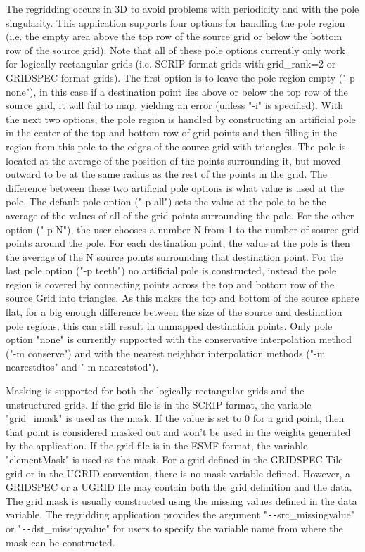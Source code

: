 The regridding occurs in 3D to avoid
problems with periodicity and with the pole singularity. This application
supports four options for handling the pole region (i.e. the empty area above the top row of the source grid or below
the bottom row of the source grid).  Note that all of these pole options currently only work for logically rectangular grids (i.e. SCRIP format grids with grid\_rank=2 or GRIDSPEC format grids). The first option is to leave the pole region empty ("-p none"), in this
case if a destination point lies above or below the
top row of the source grid, it will fail to map, yielding an error (unless "-i" is specified).
With the next two options, the pole region is handled by constructing
an artificial pole in the center of the top and bottom row of grid points and then filling
in the region from this pole to the edges of the source grid with triangles.
The pole is located at the average of the position of the points surrounding
it, but moved outward to be at the same radius as the rest of the points
in the grid. The difference between these two artificial pole options is what value is used at the pole.
The default pole option ("-p all") sets the value at the pole to be the average of the values
of all of the grid points surrounding the pole. For the other option ("-p N"), the user chooses
a number N from 1 to the number of source grid points around the pole. For
each destination point, the value at the pole is then the average of the N source points
surrounding that destination point. For the last pole option ("-p teeth") no artificial pole is constructed, instead the
pole region is covered by connecting points across the top and bottom row of the source Grid into triangles. As
this makes the top and bottom of the source sphere flat, for a big enough difference between the size of
the source and destination pole regions, this can still result in unmapped destination points.
Only pole option "none" is currently supported with the conservative interpolation method ("-m conserve") and with the
nearest neighbor interpolation methods ("-m nearestdtos" and "-m neareststod").

Masking is supported for both the logically rectangular grids and the unstructured grids.
If the grid file is in the SCRIP format, the variable "grid\_imask" is used as the mask.
If the value is set to 0 for a grid point, then that point is considered masked out and
won't be used in the weights generated by the application. If the grid file is in the ESMF format, the variable "elementMask" is used as the mask.  For a grid defined in the GRIDSPEC
Tile grid or in the UGRID convention, there is no mask variable defined.
However, a GRIDSPEC or a UGRID file may contain both the grid definition and the data.
The grid mask is usually constructed using the missing values defined in the data variable.
The regridding application provides the argument "\verb+--+src\_missingvalue" or
"\verb+--+dst\_missingvalue" for users to specify the variable name from where the mask can be
constructed.

